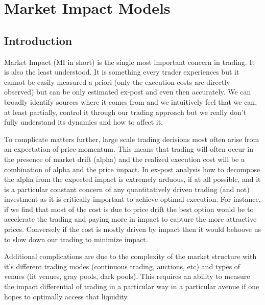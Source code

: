 \chapter{Market Impact Models}\label{chap:ch_mi_models}
\section{Introduction}

Market Impact (MI in short) is the single most important concern in trading. It is also the least understood. It is something every trader experiences but it cannot be easily measured a priori (only the execution costs are directly observed) but can be only estimated ex-post and even then accurately. We can broadly identify sources where it comes from  and we intuitively feel that we can, at least partially, control it through our trading approach but we really don't fully understand its dynamics and how to affect it.


To complicate matters further, large scale trading decisions most often arise from an expectation of price momentum. This means that trading will often occur in the presence of market drift (alpha) and the realized execution cost will be a combination of alpha and the price impact. In ex-post analysis how to decompose  the alpha from the expected impact is extremely arduous, if at all possible, and it is a particular constant concern of any quantitatively driven trading (and not) investment as it is critically important to achieve optimal execution. For instance, if we find that most of the cost is due to price drift the best option would be to accelerate the trading and paying more in impact to capture the more attractive prices. Conversely if the cost is mostly driven by impact then it would behoove us to slow down our trading to minimize impact.


Additional complications are due to the complexity of the market structure with it's different trading modes (continuous trading, auctions, etc) and types of venues (lit venues, gray pools, dark pools). This requires an ability to measure the impact differential of trading in a particular way in a particular avenue if one hopes to optimally access that liquidity.


